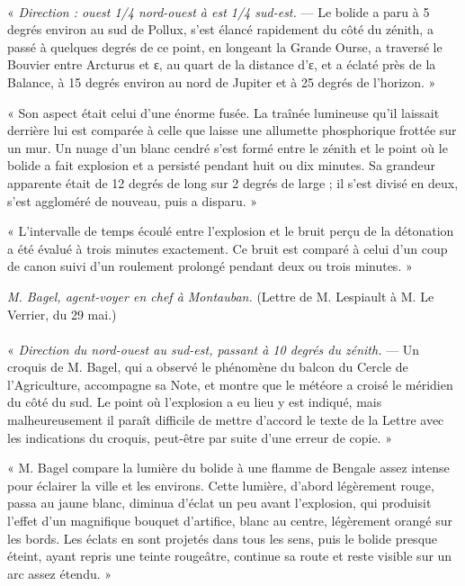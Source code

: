 \documentclass[a4paper, 11pt, oneside, polutonikogreek, french]{article}
\begin{document}
\paragraph{}
« \emph{Direction : ouest 1/4 nord-ouest à est 1/4 sud-est.} --- Le bolide a paru à 5 degrés environ au sud de Pollux, s'est élancé rapidement du côté du zénith, a passé à quelques degrés de ce point, en longeant la Grande Ourse, a traversé le Bouvier entre Arcturus et ε, au quart de la distance d'ε, et a éclaté près de la Balance, à 15 degrés environ au nord de Jupiter et à 25 degrés de l'horizon. »

« Son aspect était celui d'une énorme fusée. La traînée lumineuse qu'il laissait derrière lui est comparée à celle que laisse une allumette phosphorique frottée sur un mur. Un nuage d'un blanc cendré s'est formé entre le zénith et le point où le bolide a fait explosion et a persisté pendant huit ou dix minutes. Sa grandeur apparente était de 12 degrés de long sur 2 degrés de large ; il s'est divisé en deux, s'est aggloméré de nouveau, puis a disparu. »

« L'intervalle de temps écoulé entre l'explosion et le bruit perçu de la détonation a été évalué à trois minutes exactement. Ce bruit est comparé à celui d'un coup de canon suivi d'un roulement prolongé pendant deux ou trois minutes. »
\begin{center}
\emph{M. Bagel, agent-voyer en chef à Montauban.} (Lettre de M. Lespiault à M. Le Verrier, du 29 mai.)
\end{center}
\paragraph{}
« \emph{Direction du nord-ouest au sud-est, passant à 10 degrés du zénith.} --- Un croquis de M. Bagel, qui a observé le phénomène du balcon du Cercle de l'Agriculture, accompagne sa Note, et montre que le météore a croisé le méridien du côté du sud. Le point où l'explosion a eu lieu y est indiqué, mais malheureusement il paraît difficile de mettre d'accord le texte de la Lettre avec les indications du croquis, peut-être par suite d'une erreur de copie. »

« M. Bagel compare la lumière du bolide à une flamme de Bengale assez intense pour éclairer la ville et les environs. Cette lumière, d'abord légèrement rouge, passa au jaune blanc, diminua d'éclat un peu avant l'explosion, qui produisit l'effet d'un magnifique bouquet d'artifice, blanc au centre, légèrement orangé sur les bords. Les éclats en sont projetés dans tous les sens, puis le bolide presque éteint, ayant repris une teinte rougeâtre, continue sa route et reste visible sur un arc assez étendu. »
\end{document}
